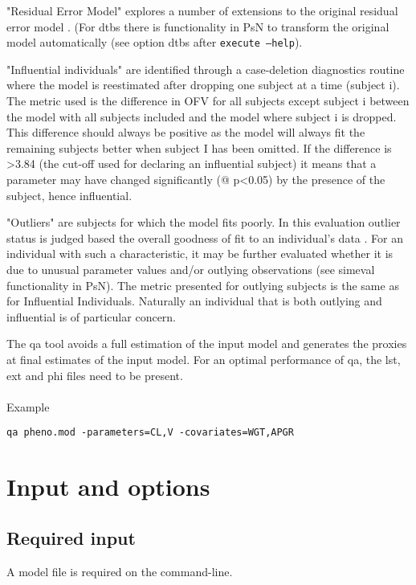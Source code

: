"Residual Error Model" explores a number of extensions to the original residual error model \cite{Ibrahim, Karlsson2, Karlsson3, Dosne2012}. (For dtbs there is functionality in PsN to transform the original model automatically (see option dtbs after \verb|execute –help|). 

"Influential individuals" are identified through a case-deletion diagnostics routine where the model is reestimated after dropping one subject at a time (subject i). The metric used is the difference in OFV for all subjects except subject i between the model with all subjects included and the model where subject i is dropped. This difference should always be positive as the model will always fit the remaining subjects better when subject I has been omitted. If the difference is >3.84 (the cut-off used for declaring an influential subject) it means that a parameter may have changed significantly (@ p<0.05) by the presence of the subject, hence influential.

"Outliers" are subjects for which the model fits poorly. In this evaluation outlier status is judged based the overall goodness of fit to an individual's data \cite{Largajolli}. For an individual with such a characteristic, it may be further evaluated whether it is due to unusual parameter values and/or outlying observations (see simeval functionality in PsN). The metric presented for outlying subjects is the same as for Influential Individuals. Naturally an individual that is both outlying and influential is of particular concern.

The qa tool avoids a full estimation of the input model and generates the proxies at final estimates of the input model. For an optimal performance of qa, the lst, ext and phi files need to be present.
\\
\\
Example
\begin{verbatim}
qa pheno.mod -parameters=CL,V -covariates=WGT,APGR
\end{verbatim}

\section{Input and options}

\subsection{Required input}
A model file is required on the command-line.



